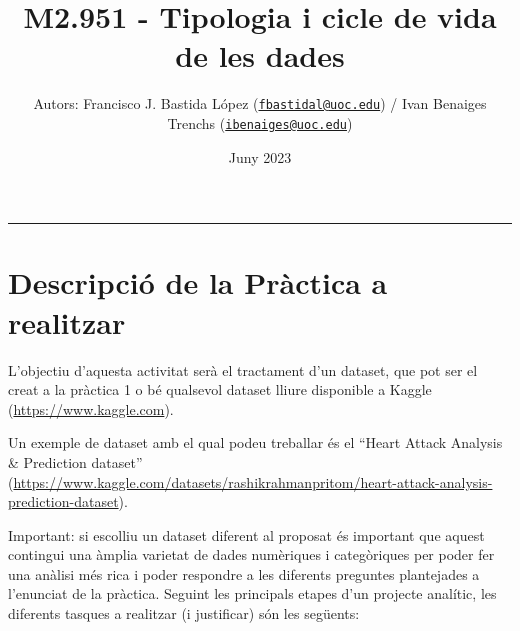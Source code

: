 \documentclass[
]{article}
\title{M2.951 - Tipologia i cicle de vida de les dades}
\author{Autors: Francisco J. Bastida López
(\href{mailto:fbastidal@uoc.edu}{\nolinkurl{fbastidal@uoc.edu}}) / Ivan
Benaiges Trenchs
(\href{mailto:ibenaiges@uoc.edu}{\nolinkurl{ibenaiges@uoc.edu}})}
\date{Juny 2023}
\begin{document}
\maketitle

{
\setcounter{tocdepth}{2}
\tableofcontents
}
\begin{center}\rule{0.5\linewidth}{0.5pt}\end{center}

\hypertarget{descripciuxf3-de-la-pruxe0ctica-a-realitzar}{%
\section*{Descripció de la Pràctica a
realitzar}\label{descripciuxf3-de-la-pruxe0ctica-a-realitzar}}

L'objectiu d'aquesta activitat serà el tractament d'un dataset, que pot
ser el creat a la pràctica 1 o bé qualsevol dataset lliure disponible a
Kaggle (\url{https://www.kaggle.com}).

Un exemple de dataset amb el qual podeu treballar és el ``Heart Attack
Analysis \& Prediction dataset''
(\url{https://www.kaggle.com/datasets/rashikrahmanpritom/heart-attack-analysis-prediction-dataset}).

Important: si escolliu un dataset diferent al proposat és important que
aquest contingui una àmplia varietat de dades numèriques i categòriques
per poder fer una anàlisi més rica i poder respondre a les diferents
preguntes plantejades a l'enunciat de la pràctica. Seguint les
principals etapes d'un projecte analític, les diferents tasques a
realitzar (i justificar) són les següents:
\end{document}
